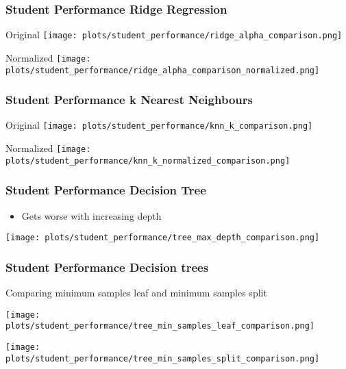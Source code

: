 \documentclass[aspectratio=169]{beamer}
\begin{document}
\begin{frame}{}
\frametitle{Student Performance Ridge Regression}
\begin{minipage}{0.49\textwidth}
    \center Original
    \texttt{[image: plots/student\_performance/ridge\_alpha\_comparison.png]}
\end{minipage}
\begin{minipage}{0.49\textwidth}
    \center Normalized
    \texttt{[image: plots/student\_performance/ridge\_alpha\_comparison\_normalized.png]}
\end{minipage}
\end{frame}

\begin{frame}{}
\frametitle{Student Performance k Nearest Neighbours}
\begin{minipage}{0.49\textwidth}
    \center Original
    \texttt{[image: plots/student\_performance/knn\_k\_comparison.png]}
\end{minipage}
\begin{minipage}{0.49\textwidth}
    \center Normalized
    \texttt{[image: plots/student\_performance/knn\_k\_normalized\_comparison.png]}
\end{minipage}
\end{frame}

\begin{frame}{}
\frametitle{Student Performance Decision Tree}
\begin{minipage}{0.3\textwidth}
\begin{itemize}
\item  Gets worse with increasing depth
\end{itemize}
\end{minipage}
\begin{minipage}{0.69\textwidth}
    \texttt{[image: plots/student\_performance/tree\_max\_depth\_comparison.png]}
\end{minipage}
\end{frame}

\begin{frame}{}
\frametitle{Student Performance Decision trees }
\center Comparing minimum samples leaf and minimum samples split 
\begin{minipage}{0.49\textwidth}
    \texttt{[image: plots/student\_performance/tree\_min\_samples\_leaf\_comparison.png]}
\end{minipage}
\begin{minipage}{0.49\textwidth}
    \texttt{[image: plots/student\_performance/tree\_min\_samples\_split\_comparison.png]}
\end{minipage}
\end{frame}
\end{document}
